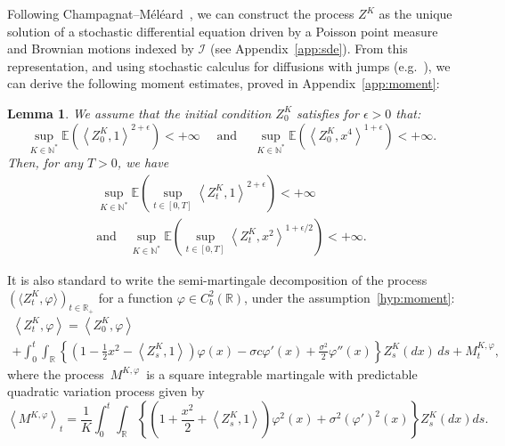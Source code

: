 \documentclass[10pt]{amsart}
\newtheorem{lemm}[theo]{Lemma}\newtheorem{prop}[theo]{Proposition}\newtheorem{coro}[theo]{Corollary}\newtheorem{conj}[theo]{Conjecture}
\theoremstyle{definition}\newtheorem{defi}[theo]{Definition}\newtheorem{rema}[theo]{Remark}\newtheorem{exam}[theo]{Example}\newtheorem{exem}[theo]{Example}\newtheorem{nota}[theo]{Notation}
\newcommand{\Io}{\mathcal{I}}
\newcommand*\N{\mathbb{N}}
\newcommand*\R{\mathbb{R}}
\newcommand*\E{\mathbb{E}}
\begin{document}
Following Champagnat--Méléard~\cite{champagnatmeleard}, we can construct the process $Z^K$ as the unique solution of a stochastic differential equation driven by a Poisson point measure and Brownian motions indexed by $\Io$ (see Appendix~\ref{app:sde}). From this representation, and using stochastic calculus for diffusions with jumps (e.g.~\cite{ikedawatanabe}), we can derive the following moment estimates, proved in Appendix~\ref{app:moment}:
\begin{lemm}\label{lem:propagation-moment}
We assume that the initial condition $Z^{K}_{0}$ satisfies for $\epsilon>0$ that:
\begin{equation}\label{hyp:moment}
\sup_{K \in \N^*}\E\left(\left\langle Z^K_0,1\right\rangle^{2+\epsilon} \right)<+\infty\quad \text{ and }\quad \sup_{K \in \N^*} \E\left(\left\langle Z^K_0,x^4\right\rangle^{1+\epsilon}\right)<+\infty.
\end{equation}
Then, for any $T>0$, we have
\begin{multline}\label{eq:propagation}
\sup_{K \in \N^*} \E\left(\sup_{t \in [0, T]} \left\langle Z^K_t,1\right\rangle^{2+\epsilon}\right)<+\infty\\
\text{and}\quad
\sup_{K \in \N^*} \E\left(\sup_{t \in [0, T]} \left\langle Z^K_t,x^2\right\rangle^{1+\epsilon/2}\right)<+\infty.
\end{multline}
\end{lemm}


It is also standard to write the semi-martingale decomposition of the process $(\langle Z^K_t,\varphi\rangle)_{t \in \R_+}$ for a function $\varphi\in C^2_b(\R)$, under the assumption~\eqref{hyp:moment}:
\begin{multline}\label{process-moving}
\left\langle Z^{K}_{t},\varphi\right\rangle=\left\langle Z^{K}_0,\varphi\right\rangle\\
+\int_{0}^{t} \int_{\R} \left\{ \left(1-\frac{1}{2}x^2-\left\langle Z^{K}_{s}, 1\right\rangle\right)\varphi(x)-\sigma c \varphi'(x)+\frac{\sigma^2}{2}\varphi''(x)\right\} Z^{K}_{s}(dx)\, ds+M^{K, \varphi}_{t},
\end{multline}
where the process $\,M^{K, \varphi}\,$ is a square integrable martingale with predictable quadratic variation process given by
\begin{equation}\label{qv}
\left\langle M^{K, \varphi} \right\rangle_{t} = \frac{1}{K} \int_{0}^t \int_{\R} \left\{ \left(1+\frac{x^2}{2} + \left\langle Z^{K}_{s}, 1\right\rangle\right)\varphi^2(x) + {\sigma^2} (\varphi')^2(x)\right\} Z^{K}_{s}(dx) ds.
\end{equation}
\end{document}
